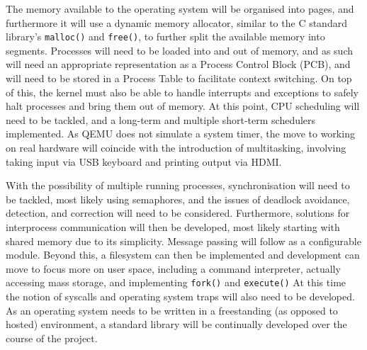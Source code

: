 \documentclass[10pt,a4paper]{article}
\newcommand{\code}[1]{\texttt{#1}}
\begin{document}
The memory available to the operating system will be organised into pages, and
furthermore it will use a dynamic memory allocator, similar to the C standard
library's \code{malloc()} and \code{free()}, to further split the available
memory into segments. Processes will need to be loaded into and out of memory,
and as such will need an appropriate representation as a Process Control Block
(PCB), and will need to be stored in a Process Table to facilitate context
switching. On top of this, the kernel must also be able to handle interrupts and
exceptions to safely halt processes and bring them out of memory. At this point,
CPU scheduling will need to be tackled, and a long-term and multiple short-term
schedulers implemented. As QEMU does not simulate a system timer, the move to
working on real hardware will coincide with the introduction of multitasking,
involving taking input via USB keyboard and printing output via HDMI.

With the possibility of multiple running processes, synchronisation will need to
be tackled, most likely using semaphores, and the issues of deadlock avoidance,
detection, and correction will need to be considered. Furthermore, solutions for
interprocess communication will then be developed, most likely starting with
shared memory due to its simplicity. Message passing will follow as a
configurable module. Beyond this, a filesystem can then be implemented and
development can move to focus more on user space, including a command
interpreter, actually accessing mass storage, and implementing \code{fork()} and
\code{execute()} At this time the notion of syscalls and operating system traps
will also need to be developed. As an operating system needs to be written in a
freestanding (as opposed to hosted) environment, a standard library will be
continually developed over the course of the project.
\end{document}
